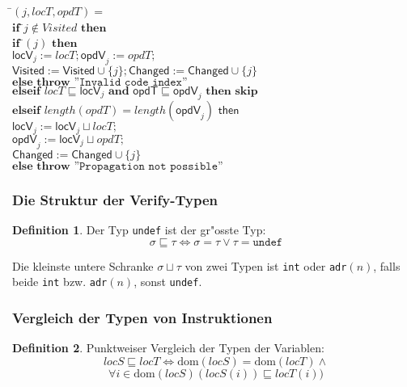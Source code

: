 \documentclass[german,10pt, a4paper, twocolumn]{scrartcl}
\theoremstyle{definition}
\newtheorem{definition}{Definition}[section]
\theoremstyle{remark}
\begin{document}
\small
\begin{tabbing}
\=$(j, locT, opdT) =$\\
\>	$\textbf{if }$\=$ j\not \in Visited \textbf{ then}$\\
\>	\>	$\textbf{if }$\= $(j) \textbf{ then}$\\
\>	\>	\>	$\textsf{locV}_j := locT; \textsf{opdV}_j := opdT;$\\
\>	\>	\>	$\textsf{Visited} := \textsf{Visited} \cup \{ j\}; \textsf{Changed} := \textsf{Changed}\cup \{j\}$\\
\>	\>	$\textbf{else throw} \texttt{ ''Invalid code index''}$\\
\>	$\textbf{elseif } locT \sqsubseteq \textsf{locV}_j \textbf{ and } \textsf{opdT} \sqsubseteq \textsf{opdV}_j \textbf{ then skip}$\\
\>	$\textbf{elseif } length(opdT) = length(\textsf{opdV}_j) \textsf{ then}$\\
\>	\>	$\textsf{locV}_j := \textsf{locV}_j \sqcup locT;$\\
\>	\>	$\textsf{opdV}_j := \textsf{locV}_j \sqcup opdT;$\\
\>	\>	$\textsf{Changed} := \textsf{Changed} \cup \{ j\}$\\
\>	$\textbf{else throw } \texttt{''Propagation not possible''}$
\end{tabbing}
\normalsize

\subsubsection{Die Struktur der Verify-Typen}

\begin{definition}
Der Typ \texttt{undef} ist der gr"osste Typ:
\begin{displaymath}
	\sigma \sqsubseteq \tau \Leftrightarrow \sigma = \tau \lor \tau = \texttt{undef}
\end{displaymath}
\end{definition}

Die kleinste untere Schranke $\sigma \sqcup \tau$ von zwei Typen ist \texttt{int} oder \texttt{adr}$(n)$, falls beide \texttt{int} bzw. \texttt{adr}$(n)$, sonst \texttt{undef}.

\subsubsection{Vergleich der Typen von Instruktionen}

\begin{definition}
	Punktweiser Vergleich der Typen der Variablen:
	\begin{displaymath}
		locS \sqsubseteq locT \Leftrightarrow \mbox{dom}(locS) = \mbox{dom}(locT) \land
	\end{displaymath}
	\begin{displaymath}
		\forall i \in \mbox{dom}(locS)(locS(i))\sqsubseteq locT(i))
	\end{displaymath}
\end{definition}
\end{document}
